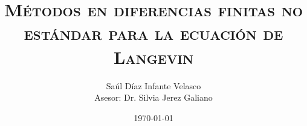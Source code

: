 \title[Tesis]
{
 \textsc{M\'etodos en diferencias finitas no est\'andar para la ecuaci\'on de Langevin}
}

\author[]
  {Sa\'ul D\'iaz Infante Velasco\\
   Asesor: Dr. Silvia Jerez Galiano}


\date[]
  {
  \today
  }

\begin{frame}
  \titlepage
\end{frame}

